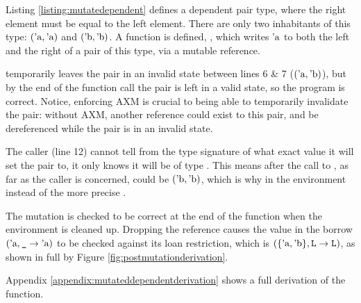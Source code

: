 \documentclass[12pt,twoside]{report}
\begin{document}
Listing \ref{listing:mutatedependent} defines a dependent pair type, where the right element must be equal to the left element. There are only two inhabitants of this type: $(\text{'a}, \text{'a})$ and $(\text{'b}, \text{'b})$. A function is defined, , which writes $\text{'a}$ to both the left and the right of a pair of this type, via a mutable reference.

 temporarily leaves the pair in an invalid state between lines 6 \& 7 ($(\text{'a}, \text{'b})$), but by the end of the function call the pair is left in a valid state, so the program is correct. Notice, enforcing AXM is crucial to being able to temporarily invalidate the pair: without AXM, another reference could exist to this pair, and be dereferenced while the pair is in an invalid state.

The caller (line 12) cannot tell from the type signature of  what exact value it will set the pair to, it only knows it will be of type . This means after the call to , as far as the caller is concerned,  could be $(\text{'b}, \text{'b})$, which is why  in the environment instead of the more precise .

The mutation is checked to be correct at the end of the function when the environment is cleaned up. Dropping the reference causes the value in the borrow $(\text{'a}, \text{\texttt{\_}} \rightarrow \text{'a})$ to be checked against its loan restriction, which is $(\{\text{'a}, \text{'b}\}, \text{\texttt{L}} \rightarrow \text{\texttt{L}})$, as shown in full by Figure \ref{fig:postmutationderivation}.

Appendix \ref{appendix:mutateddependentderivation} shows a full derivation of the  function.
\end{document}
